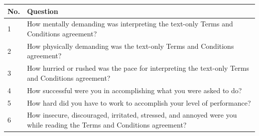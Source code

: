 \documentclass{standalone}
\begin{document}
	\begin{tabular}{|l|l|}
		\hline
		No. & Question\\
		\hline
		1 & How mentally demanding was interpreting the text-only Terms and Conditions agreement?\\
		\hline
		2 & How physically demanding was the text-only Terms and Conditions agreement?\\
		\hline
		3 & How hurried or rushed was the pace for interpreting the text-only Terms and Conditions agreement?\\
		\hline
		4 & How successful were you in accomplishing what you were asked to do?\\
		\hline
		5 & How hard did you have to work to accomplish your level of performance?\\
		\hline
		6 & How insecure, discouraged, irritated, stressed, and annoyed were you while reading the Terms and Conditions agreement?\\
		\hline
	\end{tabular}
	
\end{document}
